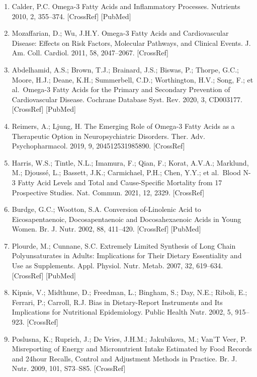 \documentclass[journal=jacsat,manuscript=article]{achemso}
\providecommand{\tightlist}{%
  \setlength{\itemsep}{0pt}\setlength{\parskip}{0pt}}
\begin{document}
\begin{enumerate}
\def\labelenumi{\arabic{enumi}.}
\tightlist
\item
  Calder, P.C. Omega-3 Fatty Acids and Inflammatory Processes. Nutrients
  2010, 2, 355--374. {[}CrossRef{]} {[}PubMed{]}
\item
  Mozaffarian, D.; Wu, J.H.Y. Omega-3 Fatty Acids and Cardiovascular
  Disease: Effects on Risk Factors, Molecular Pathways, and Clinical
  Events. J. Am. Coll. Cardiol. 2011, 58, 2047--2067. {[}CrossRef{]}
\item
  Abdelhamid, A.S.; Brown, T.J.; Brainard, J.S.; Biswas, P.; Thorpe,
  G.C.; Moore, H.J.; Deane, K.H.; Summerbell, C.D.; Worthington, H.V.;
  Song, F.; et al.~Omega-3 Fatty Acids for the Primary and Secondary
  Prevention of Cardiovascular Disease. Cochrane Database Syst. Rev.
  2020, 3, CD003177. {[}CrossRef{]} {[}PubMed{]}
\item
  Reimers, A.; Ljung, H. The Emerging Role of Omega-3 Fatty Acids as a
  Therapeutic Option in Neuropsychiatric Disorders. Ther. Adv.
  Psychopharmacol. 2019, 9, 204512531985890. {[}CrossRef{]}
\item
  Harris, W.S.; Tintle, N.L.; Imamura, F.; Qian, F.; Korat, A.V.A.;
  Marklund, M.; Djoussé, L.; Bassett, J.K.; Carmichael, P.H.; Chen,
  Y.Y.; et al.~Blood N-3 Fatty Acid Levels and Total and Cause-Specific
  Mortality from 17 Prospective Studies. Nat. Commun. 2021, 12, 2329.
  {[}CrossRef{]}
\item
  Burdge, G.C.; Wootton, S.A. Conversion of-Linolenic Acid to
  Eicosapentaenoic, Docosapentaenoic and Docosahexaenoic Acids in Young
  Women. Br. J. Nutr. 2002, 88, 411--420. {[}CrossRef{]} {[}PubMed{]}
\item
  Plourde, M.; Cunnane, S.C. Extremely Limited Synthesis of Long Chain
  Polyunsaturates in Adults: Implications for Their Dietary Essentiality
  and Use as Supplements. Appl. Physiol. Nutr. Metab. 2007, 32,
  619--634. {[}CrossRef{]} {[}PubMed{]}
\item
  Kipnis, V.; Midthune, D.; Freedman, L.; Bingham, S.; Day, N.E.;
  Riboli, E.; Ferrari, P.; Carroll, R.J. Bias in Dietary-Report
  Instruments and Its Implications for Nutritional Epidemiology. Public
  Health Nutr. 2002, 5, 915--923. {[}CrossRef{]}
\item
  Poslusna, K.; Ruprich, J.; De Vries, J.H.M.; Jakubikova, M.; Van'T
  Veer, P. Misreporting of Energy and Micronutrient Intake Estimated by
  Food Records and 24hour Recalls, Control and Adjustment Methods in
  Practice. Br. J. Nutr. 2009, 101, S73--S85. {[}CrossRef{]}

\end{enumerate}
\end{document}
